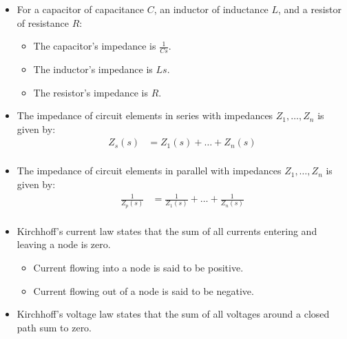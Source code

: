 \documentclass{article}
\begin{document}
\begin{itemize}
	\begin{itemize}
		\item Note: Not used much if at all in this course.
	\end{itemize}
	\item For a capacitor of capacitance $C$, an inductor of inductance $L$, and a resistor of resistance $R$:
	\begin{itemize}
		\item The capacitor's impedance is $\frac{1}{Cs}$.
		\item The inductor's impedance is $Ls$.
		\item The resistor's impedance is $R$.
	\end{itemize}
	\item The impedance of circuit elements in series with impedances $Z_1, \ldots, Z_n$ is given by:
\begin{align*}
	Z_s(s) &= Z_1(s) + \ldots + Z_n(s) \\
\end{align*}
	\item The impedance of circuit elements in parallel with impedances $Z_1, \ldots, Z_n$ is given by:
\begin{align*}
	\frac{1}{Z_p(s)} &= \frac{1}{Z_1(s)} + \ldots + \frac{1}{Z_n(s)} \\
\end{align*}

	\item Kirchhoff's current law states that the sum of all currents entering and leaving a node is zero.
	\begin{itemize}
		\item Current flowing into a node is said to be positive.
		\item Current flowing out of a node is said to be negative.
	\end{itemize}
	\item Kirchhoff's voltage law states that the sum of all voltages around a closed path sum to zero.
\end{itemize}

\ifdefined\iscombined
	\newpage
\else
	
\end{document}
